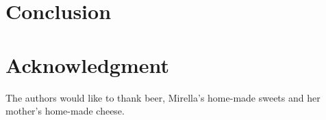 \documentclass[conference]{IEEEtran}
\begin{document}
\section{Conclusion}\label{conc}


\section*{Acknowledgment}

The authors would like to thank beer, Mirella's home-made sweets and her mother's home-made cheese.





%
%
%




\end{document}

